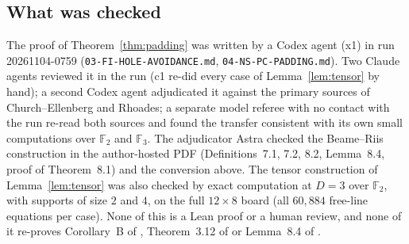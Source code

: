 \subsection{What was checked}\label{sec:growth-provenance}

The proof of Theorem~\ref{thm:padding} was written by a Codex agent (x1) in run 20261104-0759
(\texttt{03-FI-HOLE-AVOIDANCE.md}, \texttt{04-NS-PC-PADDING.md}).  Two Claude agents reviewed
it in the run (c1 re-did every case of Lemma~\ref{lem:tensor} by hand); a second Codex agent
adjudicated it against the primary sources of Church--Ellenberg and Rhoades; a separate
model referee with no contact with the run re-read both sources and found the transfer
consistent with its own small computations over $\mathbb F_2$ and $\mathbb F_3$.  The
adjudicator Astra checked the Beame--Riis construction in the author-hosted PDF
(Definitions~7.1, 7.2, 8.2, Lemma~8.4, proof of Theorem~8.1) and the conversion above.
The tensor construction of Lemma~\ref{lem:tensor} was also checked by exact computation at
$D=3$ over $\mathbb F_2$, with supports of size $2$ and $4$, on the full $12\times8$ board
(all $60{,}884$ free-line equations per case).  None of this is a Lean proof or a human
review, and none of it re-proves Corollary~B of \cite{churchellenberg}, Theorem~3.12 of
\cite{rhoades2024} or Lemma~8.4 of \cite{beame1998counting}.
